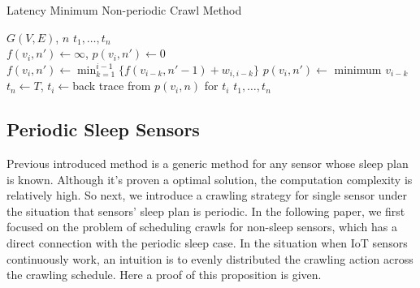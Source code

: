 \documentclass[conference]{IEEEtran}
\begin{document}
\begin{algorithm}
	\caption{Latency Minimum Non-periodic Crawl Method}
	\label{alg:dp_min}
	\begin{algorithmic}[1]
		\renewcommand{\algorithmicrequire}{\textbf{Input:}}
		\renewcommand{\algorithmicensure}{\textbf{Output:}}
		\REQUIRE $G(V,E)$, $n$
		\ENSURE  $t_1,\ldots,t_n$
		\\
		\STATE $f(v_i,n') \gets \infty$, $p(v_i,n')\gets 0$
		\STATE $f(v_i,n')\gets\min_{k=1}^{i-1}\{f(v_{i-k}, n'-1)+w_{i,i-k}\}$
		\STATE $p(v_i,n')\gets$ minimum $v_{i-k}$
		\ENDFOR
		\ENDFOR
		\STATE $t_n\gets T$, $t_i\gets$back trace from $p(v_i, n)$ for $t_i$
		\RETURN $t_1,\ldots,t_n$
	\end{algorithmic}
\end{algorithm}


\subsection{Periodic Sleep Sensors}

Previous introduced method is a generic method for any sensor whose sleep plan is known. Although it's proven a optimal solution, the computation complexity is relatively high.
So next, we introduce a crawling strategy for single sensor under the situation that sensors' sleep plan is periodic.
In the following paper, we first focused on the problem of scheduling crawls for non-sleep sensors, which has a direct connection with the periodic sleep case.
In the situation when IoT sensors continuously work, an intuition is to evenly distributed the crawling action across the crawling schedule. Here a proof of this proposition is given.
\end{document}
